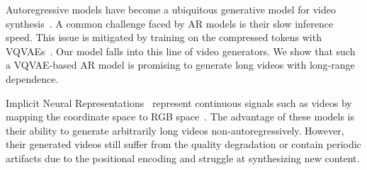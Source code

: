  Autoregressive models have become a ubiquitous generative model for video synthesis~\cite{ranzato2014video,srivastava2015unsupervised,kalchbrenner2017video,Weissenborn2020Scaling}. 
A common challenge faced by AR models is their slow inference speed. This issue is mitigated by training on the compressed tokens with VQVAEs~\cite{rakhimov2020latent,wu2021n,le2021ccvs,yan2021videogpt}. 
Our model falls into this line of video generators. We show that such a VQVAE-based AR model is promising to generate long videos with long-range dependence.

 Implicit Neural Representations~\cite{sitzmann2020implicit,tancik2020fourier} represent continuous signals such as videos by mapping the coordinate space to RGB space~\cite{yu2021generating,skorokhodov2021stylegan}. 
The advantage of these models is their ability to generate arbitrarily long videos non-autoregressively. However, their generated videos still suffer from the quality degradation or contain periodic artifacts due to the positional encoding and struggle at synthesizing new content. 

